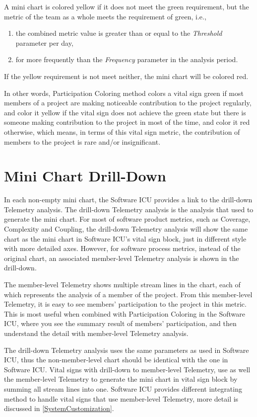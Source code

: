 A mini chart is colored yellow if it does not meet the green requirement, but the metric of the team as a whole meets the requirement of green, i.e., 
\begin{enumerate}
\item the combined metric value is greater than or equal to the {\it Threshold} parameter per day,
\item for more frequently than the {\it Frequency} parameter in the analysis period.
\end{enumerate}

If the yellow requirement is not meet neither, the mini chart will be colored red.

In other words, Participation Coloring method colors a vital sign green if most members of a project are making noticeable contribution to the project regularly, and color it yellow if the vital sign does not achieve the green state but there is someone making contribution to the project in most of the time, and color it red otherwise, which means, in terms of this vital sign metric, the contribution of members to the project is rare and/or insignificant.

\section{Mini Chart Drill-Down}
In each non-empty mini chart, the Software ICU provides a link to the drill-down Telemetry analysis. The drill-down Telemetry analysis is the analysis that used to generate the mini chart. For most of software product metrics, such as Coverage, Complexity and Coupling, the drill-down Telemetry analysis will show the same chart as the mini chart in Software ICU's vital sign block, just in different style with more detailed axes. However, for software process metrics, instead of the original chart, an associated member-level Telemetry analysis is shown in the drill-down. 

The member-level Telemetry shows multiple stream lines in the chart, each of which represents the analysis of a member of the project. From this member-level Telemetry, it is easy to see members' participation to the project in this metric. This is most useful when combined with Participation Coloring in the Software ICU, where you see the summary result of members' participation, and then understand the detail with member-level Telemetry analysis.

The drill-down Telemetry analysis uses the same parameters as used in Software ICU, thus the non-member-level chart should be identical with the one in Software ICU. Vital signs with drill-down to member-level Telemetry, use as well the member-level Telemetry to generate the mini chart in vital sign block by summing all stream lines into one. Software ICU provides different integrating method to handle vital signs that use member-level Telemetry, more detail is discussed in \autoref{SystemCustomization}.


